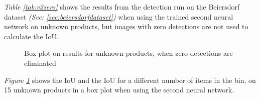\textit{Table \ref{tab:v2zero}} shows the results from the detection run on the Beiersdorf dataset \textit{(Sec: \ref{sec:beiersdorfdataset})} when using the trained second neural network on unknown products, but images with zero detections are not used to calculate the IoU. %

\begin{figure}[h]
 \centering
 \hfill
 
 \caption{Box plot on results for unknown products, when zero detections are eliminated}
 \label{fig:v2zerofig}
\end{figure}

\textit{Figure \ref{fig:v2zerofig}} shows the IoU and the IoU for a different number of items in the bin, on 15 unknown products in a box plot when using the second neural network.


\clearpage
